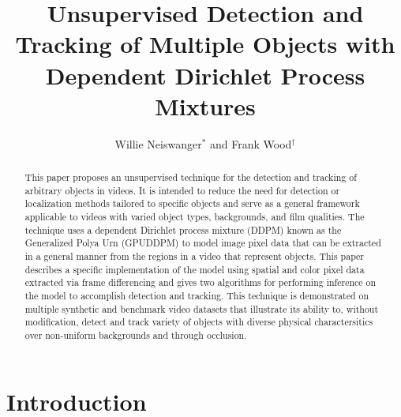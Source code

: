 \documentclass[smallcondensed, final]{svjour3}
\begin{document}
\title{Unsupervised Detection and Tracking of Multiple Objects with Dependent Dirichlet Process Mixtures}
\author{Willie Neiswanger$^{*}$ and Frank Wood$^{\dagger}$}
\date{}

\maketitle

\begin{abstract}
This paper proposes an unsupervised technique for the detection and tracking of arbitrary objects in videos. It is intended to reduce the need for detection or localization methods tailored to specific objects and serve as a general framework applicable to videos with varied object types, backgrounds, and film qualities. The technique uses a dependent Dirichlet process mixture (DDPM) known as the Generalized Polya Urn (GPUDDPM) to model image pixel data that can be extracted in a general manner from the regions in a video that represent objects. This paper describes a specific implementation of the model using spatial and color pixel data extracted via frame differencing and gives two algorithms for performing inference on the model to accomplish detection and tracking. This technique is demonstrated on multiple synthetic and benchmark video datasets that illustrate its ability to, without modification, detect and track variety of objects with diverse physical charactersitics over non-uniform backgrounds and through occlusion.
\end{abstract}



\section{Introduction}
\end{document}
